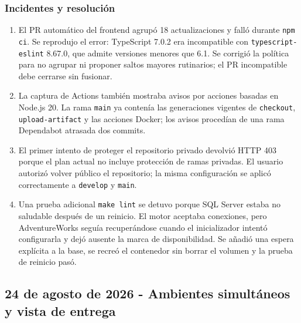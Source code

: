 \documentclass[11pt,letterpaper]{article}
\newcommand{\file}[1]{\texttt{#1}}
\begin{document}
\subsubsection{Incidentes y resolución}

\begin{enumerate}
  \item El PR automático del frontend agrupó 18 actualizaciones y falló durante \file{npm ci}. Se reprodujo el error: TypeScript 7.0.2 era incompatible con \file{typescript-}\allowbreak\file{eslint} 8.67.0, que admite versiones menores que 6.1. Se corrigió la política para no agrupar ni proponer saltos mayores rutinarios; el PR incompatible debe cerrarse sin fusionar.
  \item La captura de Actions también mostraba avisos por acciones basadas en Node.js 20. La rama \file{main} ya contenía las generaciones vigentes de \file{checkout}, \file{upload-artifact} y las acciones Docker; los avisos procedían de una rama Dependabot atrasada dos commits.
  \item El primer intento de proteger el repositorio privado devolvió HTTP 403 porque el plan actual no incluye protección de ramas privadas. El usuario autorizó volver público el repositorio; la misma configuración se aplicó correctamente a \file{develop} y \file{main}.
  \item Una prueba adicional \file{make lint} se detuvo porque SQL Server estaba no saludable después de un reinicio. El motor aceptaba conexiones, pero AdventureWorks seguía recuperándose cuando el inicializador intentó configurarla y dejó ausente la marca de disponibilidad. Se añadió una espera explícita a la base, se recreó el contenedor sin borrar el volumen y la prueba de reinicio pasó.
\end{enumerate}

\subsection{24 de agosto de 2026 - Ambientes simultáneos y vista de entrega}
\end{document}

